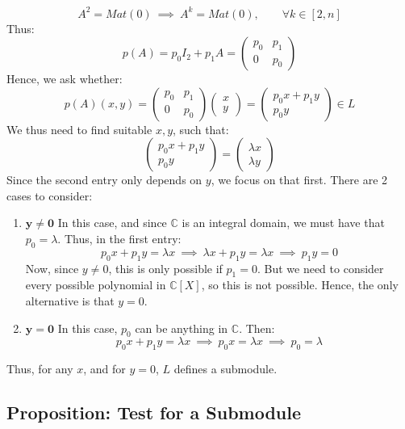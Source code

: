 \documentclass{exam}
\begin{document}
\begin{itemize}
    \[
    A^2 = Mat(0) \ \implies \ A^k = Mat(0), \qquad \forall k \in [2,n]
    \]
    Thus:
    \[
    p(A) = p_0I_2 + p_1A = \begin{pmatrix}
    p_0 & p_1 \\
    0 & p_0
    \end{pmatrix}
    \]
    Hence, we ask whether:
    \[
    p(A)(x,y) = \begin{pmatrix}
    p_0 & p_1 \\
    0 & p_0
    \end{pmatrix}
    \begin{pmatrix}
    x \\
    y
    \end{pmatrix}
    = 
    \begin{pmatrix}
    p_0x + p_1y \\
    p_0y
    \end{pmatrix}
    \in L
    \]
    We thus need to find suitable $x,y$, such that:
    \[
    \begin{pmatrix}
    p_0x + p_1y \\
    p_0y
    \end{pmatrix}
    =
    \begin{pmatrix}
    \lambda x \\
    \lambda y
    \end{pmatrix}
    \]
    Since the second entry only depends on $y$, we focus on that first. There are 2 cases to consider:
    \begin{enumerate}
        \item $\boldsymbol{y \neq 0}$
        In this case, and since $\mathbb{C}$ is an integral domain, we must have that $p_0 = \lambda$. Thus, in the first entry:
        \[
        p_0x + p_1y = \lambda x \ \implies \ \lambda x + p_1y = \lambda x \ \implies \ p_1y = 0
        \]
        Now, since $y \neq 0$, this is only possible if $p_1 = 0$. But we need to consider every possible polynomial in $\mathbb{C}[X]$, so this is not possible. Hence, the only alternative is that $y = 0$.
        \item $\boldsymbol{y = 0}$
        In this case, $p_0$ can be anything in $\mathbb{C}$. Then:
        \[
        p_0x + p_1y = \lambda x \ \implies \ p_0x = \lambda x \ \implies \ p_0 = \lambda
        \]
    \end{enumerate}
    Thus, for any $x$, and for $y = 0$, $L$ defines a submodule.
\end{itemize}

\subsection{Proposition: Test for a Submodule}
\end{document}
